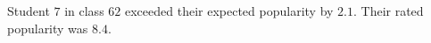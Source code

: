 \documentclass[]{article}
\newenvironment{Shaded}{\begin{snugshade}}{\end{snugshade}}
\newcommand{\KeywordTok}[1]{\textcolor[rgb]{0.13,0.29,0.53}{\textbf{#1}}}
\newcommand{\DataTypeTok}[1]{\textcolor[rgb]{0.13,0.29,0.53}{#1}}
\newcommand{\DecValTok}[1]{\textcolor[rgb]{0.00,0.00,0.81}{#1}}
\newcommand{\StringTok}[1]{\textcolor[rgb]{0.31,0.60,0.02}{#1}}
\newcommand{\OperatorTok}[1]{\textcolor[rgb]{0.81,0.36,0.00}{\textbf{#1}}}
\newcommand{\NormalTok}[1]{#1}
\begin{document}
\begin{Shaded}
\end{Shaded}

Student \(7\) in class \(62\) exceeded their expected popularity by
\(2.1\). Their rated popularity was \(8.4\).
\end{document}
